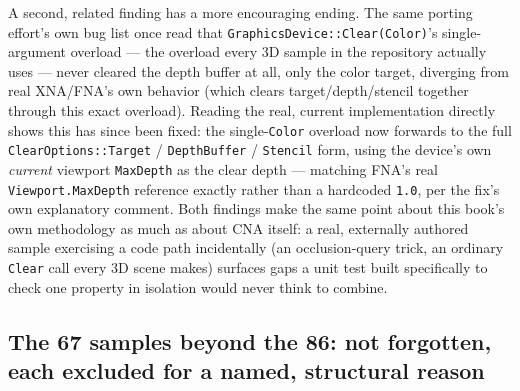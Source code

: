 A second, related finding has a more encouraging ending. The same porting effort's own bug
list once read that \texttt{GraphicsDevice::Clear(Color)}'s single-argument overload --- the
overload every 3D sample in the repository actually uses --- never cleared the depth buffer at
all, only the color target, diverging from real XNA/FNA's own behavior (which clears
target/depth/stencil together through this exact overload). Reading the real, current
implementation directly shows this has since been fixed: the single-\texttt{Color} overload now
forwards to the full \texttt{ClearOptions::Target} / \texttt{DepthBuffer} / \texttt{Stencil}
form, using the device's own \emph{current} viewport \texttt{MaxDepth}
as the clear depth --- matching FNA's real \texttt{Viewport.MaxDepth} reference exactly rather
than a hardcoded \texttt{1.0}, per the fix's own explanatory comment. Both findings make the
same point about this book's own methodology as much as about CNA itself: a real, externally
authored sample exercising a code path incidentally (an occlusion-query trick, an ordinary
\texttt{Clear} call every 3D scene makes) surfaces gaps a unit test built specifically to check
one property in isolation would never think to combine.

\subsection{The 67 samples beyond the 86: not forgotten, each excluded for a named, structural reason}


